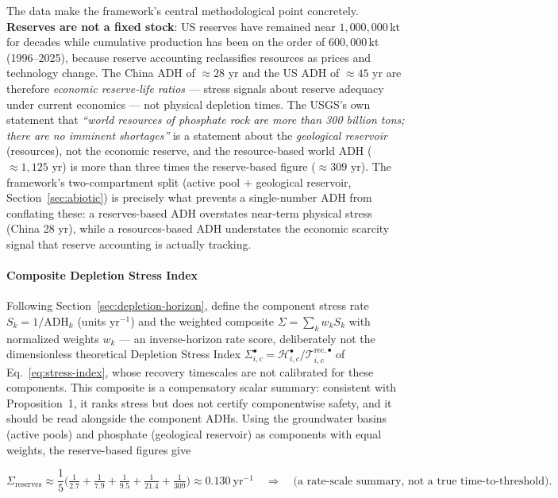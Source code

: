 \documentclass[twocolumn,10pt]{article}
\begin{document}
The data make the framework's central methodological point concretely. \textbf{Reserves are not a fixed stock}: US reserves have remained near $1{,}000{,}000$\,kt for decades while cumulative production has been on the order of $600{,}000$\,kt (1996--2025), because reserve accounting reclassifies resources as prices and technology change. The China ADH of $\approx28$ yr and the US ADH of $\approx45$ yr are therefore \emph{economic reserve-life ratios} --- stress signals about reserve adequacy under current economics --- not physical depletion times. The USGS's own statement that \emph{``world resources of phosphate rock are more than 300 billion tons; there are no imminent shortages''} is a statement about the \emph{geological reservoir} (resources), not the economic reserve, and the resource-based world ADH ($\approx1{,}125$ yr) is more than three times the reserve-based figure ($\approx309$ yr). The framework's two-compartment split (active pool + geological reservoir, Section~\ref{sec:abiotic}) is precisely what prevents a single-number ADH from conflating these: a reserves-based ADH overstates near-term physical stress (China 28 yr), while a resources-based ADH understates the economic scarcity signal that reserve accounting is actually tracking.

\paragraph{Composite Depletion Stress Index}
\label{sec:adh-composite}

Following Section~\ref{sec:depletion-horizon}, define the component stress rate $S_k=1/\text{ADH}_k$ (units yr$^{-1}$) and the weighted composite $\Sigma=\sum_k w_k S_k$ with normalized weights $w_k$ --- an inverse-horizon rate score, deliberately not the dimensionless theoretical Depletion Stress Index $\Sigma^{\bullet}_{i,c}=\mathcal H^{\bullet}_{i,c}/\mathcal T^{\text{rec},\bullet}_{i,c}$ of Eq.~\eqref{eq:stress-index}, whose recovery timescales are not calibrated for these components. This composite is a compensatory scalar summary: consistent with Proposition~1, it ranks stress but does not certify componentwise safety, and it should be read alongside the component ADHs. Using the groundwater basins (active pools) and phosphate (geological reservoir) as components with equal weights, the reserve-based figures give

\[
\Sigma_{\text{reserves}} \approx \frac{1}{5}\Big(\tfrac{1}{2.7}+\tfrac{1}{7.9}+\tfrac{1}{9.5}+\tfrac{1}{21.4}+\tfrac{1}{309}\Big) \approx 0.130\ \text{yr}^{-1}
\quad\Longrightarrow\quad
\text{(a rate-scale summary, not a true time-to-threshold)}.
\]
\end{document}
